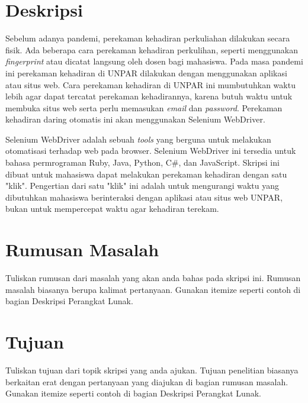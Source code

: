 \documentclass[a4paper,twoside]{article}
\begin{document}
\title{\@judultopik}
\author{\nama \textendash \@npm} 

\newcommand{\nama}{Reinalta Sugianto}
\newcommand{\@npm}{2017730035}
\newcommand{\@judultopik}{Perekaman Kehadiran Daring Otomatis} %
\newcommand{\jumpemb}{1} %
\newcommand{\tanggal}{04/10/2021}


\maketitle


\section{Deskripsi}
Sebelum adanya pandemi, perekaman kehadiran perkuliahan dilakukan secara fisik. Ada beberapa cara perekaman kehadiran perkulihan, seperti menggunakan \textit{fingerprint} atau dicatat langsung oleh dosen bagi mahasiswa. Pada masa pandemi ini perekaman kehadiran di UNPAR dilakukan dengan menggunakan aplikasi atau situs web. Cara perekaman kehadiran di UNPAR ini mumbutuhkan waktu lebih agar dapat tercatat perekaman kehadirannya, karena butuh waktu untuk membuka situs web serta perlu memasukan \textit{email} dan \textit{password}. Perekaman kehadiran daring otomatis ini akan menggunakan Selenium WebDriver.

Selenium WebDriver adalah sebuah \textit{tools} yang berguna untuk melakukan otomatisasi terhadap web pada browser. Selenium WebDriver ini tersedia untuk bahasa permrograman Ruby, Java, Python, C\#, dan JavaScript. Skripsi ini dibuat untuk mahasiswa dapat melakukan perekaman kehadiran dengan satu "klik". Pengertian dari satu "klik" ini adalah untuk mengurangi waktu yang dibutuhkan mahasiswa berinteraksi dengan aplikasi atau situs web UNPAR, bukan untuk mempercepat waktu agar kehadiran terekam. 

\section{Rumusan Masalah}
Tuliskan rumusan dari masalah yang akan anda bahas pada skripsi ini. Rumusan masalah biasanya berupa kalimat pertanyaan. Gunakan itemize seperti contoh di bagian Deskripsi Perangkat Lunak.

\section{Tujuan}
Tuliskan tujuan dari topik skripsi yang anda ajukan. Tujuan penelitian biasanya berkaitan erat dengan pertanyaan yang diajukan di bagian rumusan masalah. Gunakan itemize seperti contoh di bagian Deskripsi Perangkat Lunak.
\end{document}
